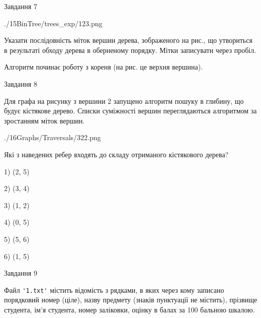 \documentclass[12pt, ukrainian]{article}
\def\code#1{\Verb!#1!}
\begin{document}
{\vspace{10mm}\par

\newpage
\begin{minipage}[t]{9.7cm}
               
{\begin{center}Завдання {7}\end{center}}
\vspace{-6mm}

\begin{center}
	{./15BinTree/trees_exp/123.png}
\end{center}
Указати послідовність міток вершин дерева, зображеного на рис., що утвориться в результаті обходу дерева в оберненому порядку. Мітки записувати через пробіл.\par Алгоритм починає роботу з кореня (на рис. це верхня вершина).\par

\end{minipage}
\vline \hspace{8mm}
\begin{minipage}[t]{8.0cm}
               
{\begin{center}Завдання {8}\end{center}}
\vspace{-6mm}
Для графа на рисунку з вершини 2 запущено алгоритм пошуку в глибину, що будує кістякове дерево. Списки суміжності вершин переглядаються алгоритмом за зростанням міток вершин.\par
\begin{center}
	{./16Graphs/Traversals/322.png}
\end{center}
\par Які з наведених ребер входять до складу отриманого кістякового дерева?\par
1) (2, 5)\par
2) (3, 4)\par
3) (1, 2)\par
4) (0, 5)\par
5) (5, 6)\par
6) (1, 5)\par
{\vskip 15pt} \par

\end{minipage}

               
{\begin{center}Завдання {9}\end{center}}
\vspace{-6mm}
Файл \code{'1.txt'} містить відомість з рядками, в яких через кому записа\-но поряд\-ковий номер (ціле), назву предмету (знаків пунктуації не містить), прізвище студента, ім'я студента, номер заліковки, оцінку в балах за 100 бальною шкалою.

}
\end{document}
